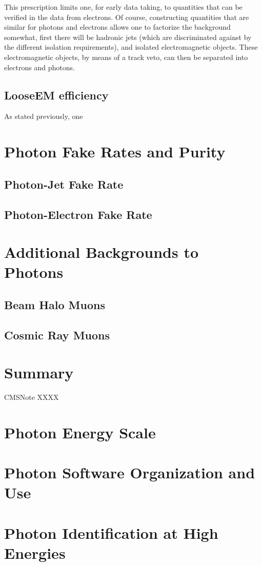 \documentclass{cmspaper}
\begin{document}
This prescription limits one, for early data taking, to quantities that can be verified in the data from electrons.  Of course, constructing quantities that are similar for photons and electrons allows one to factorize the background somewhat, first there will be hadronic jets (which are discriminated against by the different isolation requirements), and isolated electromagnetic objects.  These electromagnetic objects, by means of a track veto, can then be separated into electrons and photons.
\subsection{LooseEM efficiency}\label{ssec:LooseEMEff}
As stated previously, one 

\section{Photon Fake Rates and Purity}
\subsection{Photon-Jet Fake Rate}
\subsection{Photon-Electron Fake Rate}

\section{Additional Backgrounds to Photons}
\subsection{Beam Halo Muons}
\subsection{Cosmic Ray Muons}

\section{Summary}

\begin{thebibliography}{9}
  CMSNote XXXX


\end{thebibliography}
 
\pagebreak
\appendix
\section{Photon Energy Scale}

\section{Photon Software Organization and Use}

\section{Photon Identification at High Energies}
\end{document}
